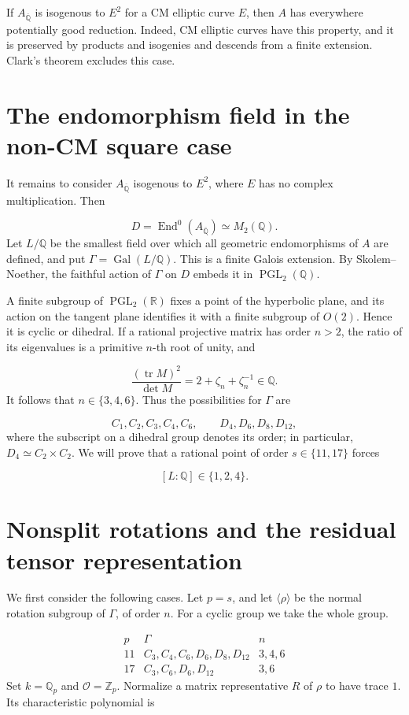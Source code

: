 \documentclass[11pt]{article}
\newcommand{\Q}{\mathbb Q}
\newcommand{\Z}{\mathbb Z}
\newcommand{\R}{\mathbb R}
\DeclareMathOperator{\End}{End}
\DeclareMathOperator{\Gal}{Gal}
\DeclareMathOperator{\PGL}{PGL}
\begin{document}
If \(A_{\overline{\Q}}\) is isogenous to \(E^2\) for a CM elliptic curve \(E\), then \(A\) has everywhere potentially good reduction. Indeed, CM elliptic curves have this property, and it is preserved by products and isogenies and descends from a finite extension. Clark's theorem excludes this case.


\section{The endomorphism field in the non-CM square case}\label{sec:endomorphism-field}
It remains to consider \(A_{\overline{\Q}}\) isogenous to \(E^2\), where \(E\) has no complex multiplication. Then

\[
D=\End^0(A_{\overline{\Q}})\simeq M_2(\Q).
\]
Let \(L/\Q\) be the smallest field over which all geometric endomorphisms of \(A\) are defined, and put \(\Gamma=\Gal(L/\Q)\). This is a finite Galois extension. By Skolem--Noether, the faithful action of \(\Gamma\) on \(D\) embeds it in \(\PGL_2(\Q)\).

A finite subgroup of \(\PGL_2(\R)\) fixes a point of the hyperbolic plane, and its action on the tangent plane identifies it with a finite subgroup of \(O(2)\). Hence it is cyclic or dihedral. If a rational projective matrix has order \(n>2\), the ratio of its eigenvalues is a primitive \(n\)-th root of unity, and

\[
\frac{(\operatorname{tr}M)^2}{\det M}=2+\zeta_n+\zeta_n^{-1}\in\Q.
\]
It follows that \(n\in\{3,4,6\}\). Thus the possibilities for \(\Gamma\) are

\[
C_1,C_2,C_3,C_4,C_6,\qquad D_4,D_6,D_8,D_{12},
\]
where the subscript on a dihedral group denotes its order; in particular, \(D_4\simeq C_2\times C_2\). We will prove that a rational point of order \(s\in\{11,17\}\) forces

\[
[L:\Q]\in\{1,2,4\}.
\]

\section{Nonsplit rotations and the residual tensor representation}\label{sec:inert-rotations}
We first consider the following cases. Let \(p=s\), and let \(\langle\rho\rangle\) be the normal rotation subgroup of \(\Gamma\), of order \(n\). For a cyclic group we take the whole group.

\[
\begin{array}{c|c|c}
p&\Gamma&n\\\hline
11&C_3,C_4,C_6,D_6,D_8,D_{12}&3,4,6\\
17&C_3,C_6,D_6,D_{12}&3,6
\end{array}
\]
Set \(k=\Q_p\) and \(\mathcal O=\Z_p\). Normalize a matrix representative \(R\) of \(\rho\) to have trace \(1\). Its characteristic polynomial is
\end{document}

